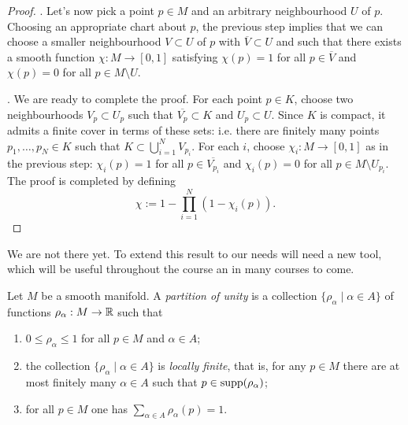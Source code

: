 \begin{proof}
  .
  Let's now pick a point $p\in M$ and an arbitrary neighbourhood $U$ of $p$. Choosing an appropriate chart about $p$, the previous step implies that we can choose a smaller neighbourhood $V\subset U$ of $p$ with $\overline V\subset U$ and such that there exists a smooth function $\chi: M \to [0,1]$ satisfying $\chi(p) = 1$ for all $p\in\overline{V}$ and $\chi(p) = 0$ for all $p\in M\setminus U$.
  
  .
  We are ready to complete the proof.
  For each point $p\in K$, choose two neighbourhoods $V_p \subset U_p$ such that $\overline{V_p}\subset K$ and $U_p \subset U$.
  Since $K$ is compact, it admits a finite cover in terms of these sets: i.e. there are finitely many points $p_1, \ldots, p_N \in K$ such that $K \subset \bigcup_{i=1}^N V_{p_i}$.
  For each $i$, choose $\chi_i: M \to [0,1]$ as in the previous step: $\chi_i(p) = 1$ for all $p\in\overline{V_{p_i}}$ and $\chi_i(p) = 0$ for all $p\in M\setminus U_{p_i}$.
  The proof is completed by defining
  \begin{equation}
    \chi := 1 - \prod_{i=1}^N(1 - \chi_i(p)).
  \end{equation}
\end{proof}

We are not there yet. To extend this result to our needs will need a new tool, which will be useful throughout the course an in many courses to come.

\begin{definition}
  Let $M$ be a smooth manifold. A \emph{partition of unity} is a collection $\{\rho_\alpha \mid \alpha\in A\}$ of functions $\rho_\alpha:M\to\mathbb{R}$ such that
  \begin{enumerate}
    \item $0 \leq \rho_\alpha \leq 1$ for all $p\in M$ and $\alpha\in A$;
    \item\label{def:pou.2} the collection $\{\rho_\alpha \mid \alpha\in A\}$ is \emph{locally finite}, that is, for any $p\in M$ there are at most finitely many $\alpha\in A$ such that $p\in\operatorname{supp}(\rho_\alpha)$;
    \item for all $p\in M$ one has $\sum_{\alpha\in A} \rho_\alpha(p) = 1$.
  \end{enumerate}
\end{definition}

